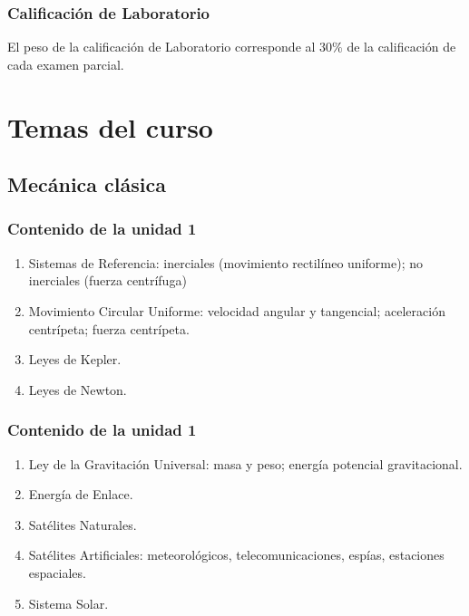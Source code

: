\documentclass[14pt]{beamer}
\begin{document}
\begin{frame}
\frametitle{Calificación de Laboratorio}
El peso de la calificación de Laboratorio corresponde al $30 \%$ de la calificación de cada examen parcial.
\end{frame}

\section{Temas del curso}
\subsection{Mecánica clásica}

\begin{frame}
\frametitle{Contenido de la unidad 1}
\begin{enumerate}[<+->]
\item Sistemas de Referencia: inerciales (movimiento rectilíneo uniforme); no inerciales (fuerza centrífuga)
\item Movimiento Circular Uniforme: velocidad angular y tangencial; aceleración centrípeta; fuerza centrípeta.
\item Leyes de Kepler.
\item Leyes de Newton.
\seti
\end{enumerate}
\end{frame}
\begin{frame}
\frametitle{Contenido de la unidad 1}
\begin{enumerate}[<+->]
\conti
\item Ley de la Gravitación Universal: masa y peso; energía potencial gravitacional.
\item Energía de Enlace.
\item Satélites Naturales.
\item Satélites Artificiales: meteorológicos, telecomunicaciones, espías, estaciones espaciales.
\item Sistema Solar.
\end{enumerate}
\end{frame}
\end{document}
